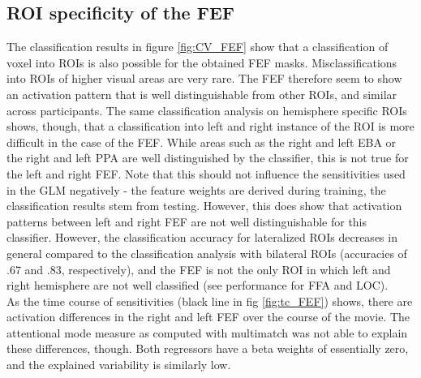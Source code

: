 \documentclass[a4paper, 12pt]{scrreprt}
\begin{document}
\subsection{ROI specificity of the FEF}
The classification results in figure \ref{fig:CV_FEF} show that a classification of voxel into ROIs is also possible for the obtained FEF masks. Misclassifications into ROIs of higher visual areas are very rare. The FEF therefore seem to show an activation pattern that is well distinguishable from other ROIs, and similar across participants. The same classification analysis on hemisphere specific ROIs shows, though, that a classification into left and right instance of the ROI is more difficult in the case of the FEF. While areas such as the right and left EBA or the right and left PPA are well distinguished by the classifier, this is not true for the left and right FEF. Note that this should not influence the sensitivities used in the GLM negatively - the feature weights are derived during training, the classification results stem from testing. However, this does show that activation patterns between left and right FEF are not well distinguishable for this classifier. However, the classification accuracy for lateralized ROIs decreases in general compared to the classification analysis with bilateral ROIs (accuracies of .67 and .83, respectively), and the FEF is not the only ROI in which left and right hemisphere are not well classified (see performance for FFA and LOC).\\
As the time course of sensitivities (black line in fig \ref{fig:tc_FEF}) shows, there are activation differences in the right and left FEF over the course of the movie. The attentional mode measure as computed with multimatch was not able to explain these differences, though. Both regressors have a beta weights of essentially zero, and the explained variability is similarly low. \\
\end{document}
